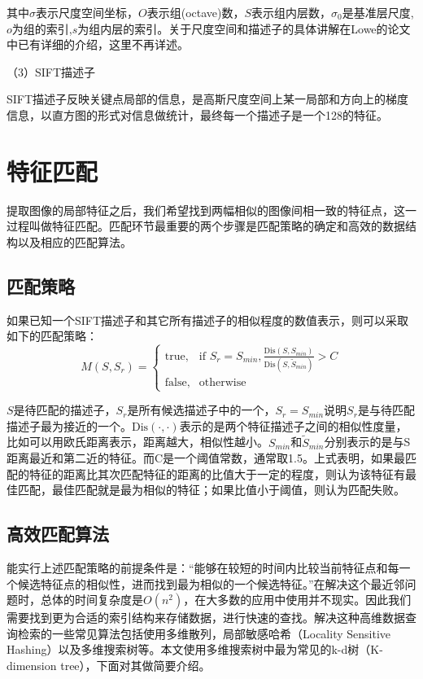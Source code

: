 其中\(σ\)表示尺度空间坐标，\(O\)表示组(octave)数，\(S\)表示组内层数，\(σ_0\)是基准层尺度,\(o\)为组的索引,\(s\)为组内层的索引。关于尺度空间和描述子的具体讲解在Lowe的论文中\cite{Lowe:2004uq}已有详细的介绍，这里不再详述。

（3）SIFT描述子

SIFT描述子反映关键点局部的信息，是高斯尺度空间上某一局部和方向上的梯度信息，以直方图的形式对信息做统计，最终每一个描述子是一个128的特征。

\section{特征匹配}
提取图像的局部特征之后，我们希望找到两幅相似的图像间相一致的特征点，这一过程叫做特征匹配。匹配环节最重要的两个步骤是匹配策略的确定和高效的数据结构以及相应的匹配算法。

\subsection{匹配策略}
如果已知一个SIFT描述子和其它所有描述子的相似程度的数值表示，则可以采取如下的匹配策略：
\begin{equation}
  M(S,S_r) = 
\begin{cases} 
\text{true}, & \mbox{if } S_r = S_{min},\frac{\text{Dis}(S,S_{min})}{\text{Dis}(S,\tilde{S}_{min})} > C \\
\text{false}, & \mbox{otherwise}
\end{cases}
\end{equation}

\(S\)是待匹配的描述子，\(S_r\)是所有候选描述子中的一个，\(S_r = S_{min}\)说明\(S_r\)是与待匹配描述子最为接近的一个。\(\text{Dis}(\cdot,\cdot)\)表示的是两个特征描述子之间的相似性度量，比如可以用欧氏距离表示，距离越大，相似性越小。\(S_{min}\)和\(\tilde{S}_{min}\)分别表示的是与S距离最近和第二近的特征。而C是一个阈值常数，通常取1.5。上式表明，如果最匹配的特征的距离比其次匹配特征的距离的比值大于一定的程度，则认为该特征有最佳匹配，最佳匹配就是最为相似的特征；如果比值小于阈值，则认为匹配失败。

\subsection{高效匹配算法}
能实行上述匹配策略的前提条件是：“能够在较短的时间内比较当前特征点和每一个候选特征点的相似性，进而找到最为相似的一个候选特征。”在解决这个最近邻问题时，总体的时间复杂度是\(O(n^2)\)，在大多数的应用中使用并不现实。因此我们需要找到更为合适的索引结构来存储数据，进行快速的查找。解决这种高维数据查询检索的一些常见算法包括使用多维散列，局部敏感哈希（Locality Sensitive Hashing）以及多维搜索树等。本文使用多维搜索树中最为常见的k-d树（K-dimension tree），下面对其做简要介绍。

